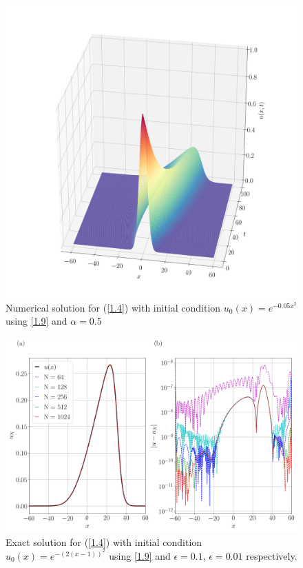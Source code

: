 	\begin{figure}
		\includegraphics[width=\textwidth]{Figures/Collocation/Graphics/eps=0.5/Numerical_Solution_alpha=05.png}
		\caption{Numerical solution for (\ref{1.4}) with initial condition $u_0 (x) = e^{- 0.05 x^2}$ using \ref{1.9} and $\alpha = 0.5$}
		\label{Exact_Solution}
	\end{figure}
	\begin{figure}
		\includegraphics[width=\textwidth]{Figures/Collocation/Graphics/eps=0.5/Numerical_Solution_alpha=05_T=100.png}
		\caption{Exact solution for (\ref{1.4}) with initial condition $u_0 (x) = e^{-(2(x - 1))^2}$ using \ref{1.9} and $\epsilon = 0.1$, $\epsilon = 0.01$ respectively.}
		\label{Exact_Solution}
	\end{figure}
